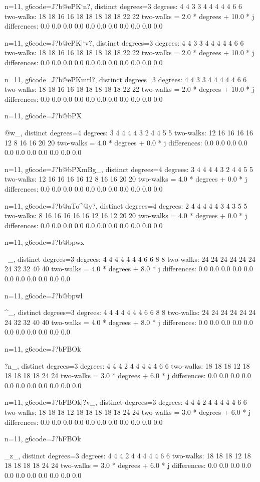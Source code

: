 {{{{{{{{{n=11, g6code=J?b@ePK}`n?, distinct degrees=3
degrees: 4 4 3 3 4 4 4 4 4 6 6 
two-walks: 18 18 16 16 18 18 18 18 18 22 22 
two-walks = 2.0 * degrees + 10.0 * j
differences: 0.0 0.0 0.0 0.0 0.0 0.0 0.0 0.0 0.0 0.0 0.0 

n=11, g6code=J?b@ePK|`v?, distinct degrees=3
degrees: 4 4 3 3 4 4 4 4 4 6 6 
two-walks: 18 18 16 16 18 18 18 18 18 22 22 
two-walks = 2.0 * degrees + 10.0 * j
differences: 0.0 0.0 0.0 0.0 0.0 0.0 0.0 0.0 0.0 0.0 0.0 

n=11, g6code=J?b@ePKmrl?, distinct degrees=3
degrees: 4 4 3 3 4 4 4 4 4 6 6 
two-walks: 18 18 16 16 18 18 18 18 18 22 22 
two-walks = 2.0 * degrees + 10.0 * j
differences: 0.0 0.0 0.0 0.0 0.0 0.0 0.0 0.0 0.0 0.0 0.0 

n=11, g6code=J?b@bPX{@w_, distinct degrees=4
degrees: 3 4 4 4 4 3 2 4 4 5 5 
two-walks: 12 16 16 16 16 12 8 16 16 20 20 
two-walks = 4.0 * degrees + 0.0 * j
differences: 0.0 0.0 0.0 0.0 0.0 0.0 0.0 0.0 0.0 0.0 0.0 

n=11, g6code=J?b@bPXmBg_, distinct degrees=4
degrees: 3 4 4 4 4 3 2 4 4 5 5 
two-walks: 12 16 16 16 16 12 8 16 16 20 20 
two-walks = 4.0 * degrees + 0.0 * j
differences: 0.0 0.0 0.0 0.0 0.0 0.0 0.0 0.0 0.0 0.0 0.0 

n=11, g6code=J?b@aTo^@y?, distinct degrees=4
degrees: 2 4 4 4 4 4 3 4 3 5 5 
two-walks: 8 16 16 16 16 16 12 16 12 20 20 
two-walks = 4.0 * degrees + 0.0 * j
differences: 0.0 0.0 0.0 0.0 0.0 0.0 0.0 0.0 0.0 0.0 0.0 

n=11, g6code=J?b@bpwx{~_, distinct degrees=3
degrees: 4 4 4 4 4 4 4 6 6 8 8 
two-walks: 24 24 24 24 24 24 24 32 32 40 40 
two-walks = 4.0 * degrees + 8.0 * j
differences: 0.0 0.0 0.0 0.0 0.0 0.0 0.0 0.0 0.0 0.0 0.0 

n=11, g6code=J?b@bpwl}^_, distinct degrees=3
degrees: 4 4 4 4 4 4 4 6 6 8 8 
two-walks: 24 24 24 24 24 24 24 32 32 40 40 
two-walks = 4.0 * degrees + 8.0 * j
differences: 0.0 0.0 0.0 0.0 0.0 0.0 0.0 0.0 0.0 0.0 0.0 

n=11, g6code=J?bFBOk}?n_, distinct degrees=3
degrees: 4 4 4 2 4 4 4 4 4 6 6 
two-walks: 18 18 18 12 18 18 18 18 18 24 24 
two-walks = 3.0 * degrees + 6.0 * j
differences: 0.0 0.0 0.0 0.0 0.0 0.0 0.0 0.0 0.0 0.0 0.0 

n=11, g6code=J?bFBOk|?v_, distinct degrees=3
degrees: 4 4 4 2 4 4 4 4 4 6 6 
two-walks: 18 18 18 12 18 18 18 18 18 24 24 
two-walks = 3.0 * degrees + 6.0 * j
differences: 0.0 0.0 0.0 0.0 0.0 0.0 0.0 0.0 0.0 0.0 0.0 

n=11, g6code=J?bFBOk{_z_, distinct degrees=3
degrees: 4 4 4 2 4 4 4 4 4 6 6 
two-walks: 18 18 18 12 18 18 18 18 18 24 24 
two-walks = 3.0 * degrees + 6.0 * j
differences: 0.0 0.0 0.0 0.0 0.0 0.0 0.0 0.0 0.0 0.0 0.0 

}}}}}}}}}
